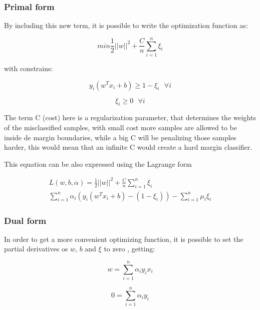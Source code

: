 \documentclass[11pt,twocolumn,letterpaper]{article}
\begin{document}
\subsubsection{Primal form}

By including this new term, it is possible to write the optimization function as:

\begin{equation}
min \frac{1}{2}||w||^2 + \frac{C}{n} \sum^n_{i=1}\xi_i
\end{equation}

with constrains:

\begin{equation}
y_i(w^T x_i + b) \geq 1 - \xi_i \:\:\:\forall i
\end{equation}

\begin{equation}
	\xi_i  \geq 0 \:\:\: \forall i
\end{equation}

The term C (cost) here is a regularization parameter, that determines the weights of the misclassified samples, with small cost more samples are allowed to be inside de margin boundaries, while a big C will be penalizing those samples harder, this would mean that an infinite C would create a hard margin classifier.

This equation can be also expressed using the Lagrange form 

\begin{multline}
L(w,b,\alpha) = \frac{1}{2}||w||^2 +\frac{C}{n} \sum^n_{i=1}\xi_i \\ \sum_{i=1}^{n} \alpha_i (y_i(w^T x_i + b) - (1 - \xi_i)) - \sum^n_{i=1} \mu_i \xi_i
\end{multline}

\subsubsection{Dual form}

In order to get a more convenient optimizing function, it is possible to set the partial derivatives os $w$, $b$ and $\xi$ to zero \cite{Hastie2009}, getting:

\begin{equation}
	w = \sum_{i=1}^{n} \alpha_i y_i x_i
\end{equation}

\begin{equation}
	0 = \sum_{i=1}^{n} \alpha_i y_i
\end{equation}
\end{document}
